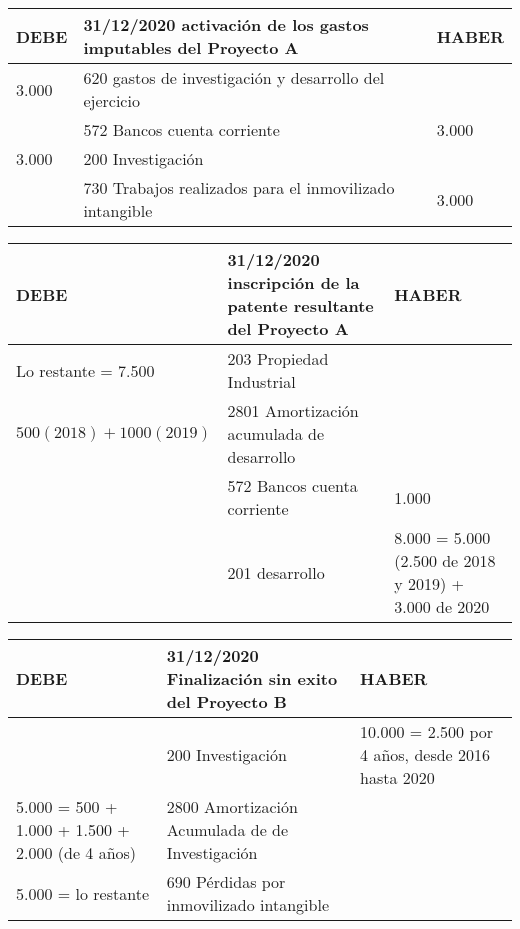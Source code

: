\documentclass[a4paper,12pt]{article}
\newcommand{\fec}{31/12/}
\newcommand{\bancos}{572 Bancos cuenta corriente}
\newcommand{\perdidasdelintangible}{690 Pérdidas por inmovilizado intangible}
\begin{document}
\begin{table}[H]
    \centering
    \begin{tabular}{|p{3cm}|p{6cm}|p{3cm}|}
    \hline
    \textbf{DEBE} & \textbf{\fec2020 activación de los gastos imputables del Proyecto A} & \textbf{HABER} \\
    \hline
    3.000 & 620 gastos de investigación y desarrollo del ejercicio& \\
    \hline
    & \bancos & 3.000\\
    \hline
    3.000& 200 Investigación& \\
    \hline
    & 730 Trabajos realizados para el inmovilizado intangible&  3.000\\
    \hline
    \end{tabular}
\end{table}

\begin{table}[H]
    \centering
    \begin{tabular}{|p{3cm}|p{6cm}|p{3cm}|}
    \hline
    \textbf{DEBE} & \textbf{\fec2020 inscripción de la patente resultante del Proyecto A} & \textbf{HABER} \\
    \hline
    Lo restante = 7.500& 203 Propiedad Industrial& \\
    \hline
    $500 (2018)+1000(2019)$& 2801 Amortización acumulada de desarrollo& \\
    \hline
    & \bancos & 1.000\\
    \hline
    & 201 desarrollo& 8.000 = 5.000 (2.500 de 2018 y 2019) + 3.000 de 2020\\
    \hline
    \end{tabular}
\end{table}

\begin{table}[H]
    \centering
    \begin{tabular}{|p{3cm}|p{6cm}|p{3cm}|}
    \hline
    \textbf{DEBE} & \textbf{\fec2020 Finalización sin exito del Proyecto B} & \textbf{HABER} \\
    \hline
    & 200 Investigación& 10.000 = 2.500 por 4 años, desde 2016 hasta 2020\\
    \hline
    5.000 = 500 + 1.000 + 1.500 + 2.000 (de 4 años)& 2800 Amortización Acumulada de de Investigación& \\
    \hline
    5.000 = lo restante& \perdidasdelintangible& \\
    \hline
    \end{tabular}
\end{table}
\end{document}
